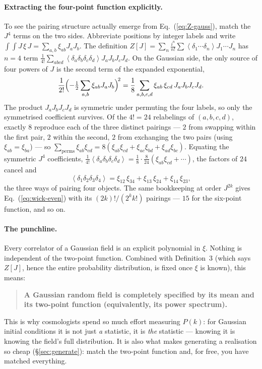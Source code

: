 \documentclass[12pt]{article}
\newcommand{\avg}[1]{\left\langle #1 \right\rangle}
\begin{document}
\paragraph{Extracting the four-point function explicitly.}  To see the
pairing structure actually emerge from Eq.~(\ref{eq:Z-gauss}), match the
$J^4$ terms on the two sides.  Abbreviate positions by integer labels and
write $\int\!\!\int J\,\xi\,J = \sum_{a,b}\xi_{ab}J_aJ_b$.  The definition
$Z[J] = \sum_n \frac{i^n}{n!}\sum \avg{\delta_1\cdots\delta_n}
J_1\cdots J_n$ has $n=4$ term
$\frac{1}{4!}\sum_{abcd}\avg{\delta_a\delta_b\delta_c\delta_d}
J_aJ_bJ_cJ_d$.  On the Gaussian side, the only source of four powers of
$J$ is the second term of the expanded exponential,
\begin{equation}
  \frac{1}{2!}\Bigl(-\tfrac12\sum_{a,b}\xi_{ab}J_aJ_b\Bigr)^{\!2}
  = \frac{1}{8}\sum_{a,b,c,d}\xi_{ab}\,\xi_{cd}\,J_aJ_bJ_cJ_d .
\end{equation}
The product $J_aJ_bJ_cJ_d$ is symmetric under permuting the four labels,
so only the symmetrised coefficient survives.  Of the $4! = 24$
relabelings of $(a,b,c,d)$, exactly $8$ reproduce each of the three
distinct pairings --- $2$ from swapping within the first pair, $2$ within
the second, $2$ from exchanging the two pairs (using
$\xi_{ab}=\xi_{ba}$) --- so
$\sum_{\text{perms}}\xi_{ab}\xi_{cd}
= 8(\xi_{ab}\xi_{cd}+\xi_{ac}\xi_{bd}+\xi_{ad}\xi_{bc})$.  Equating the
symmetric $J^4$ coefficients, $\frac{1}{4!}\avg{\delta_a\delta_b\delta_c
\delta_d} = \frac{1}{8}\cdot\frac{8}{24}
(\xi_{ab}\xi_{cd}+\cdots)$, the factors of $24$ cancel and
\begin{equation}
  \avg{\delta_1\delta_2\delta_3\delta_4}
  = \xi_{12}\,\xi_{34} + \xi_{13}\,\xi_{24} + \xi_{14}\,\xi_{23},
  \label{eq:wick4}
\end{equation}
the three ways of pairing four objects.  The same bookkeeping at order
$J^{2k}$ gives Eq.~(\ref{eq:wick-even}) with its
$(2k)!/(2^k k!)$ pairings --- $15$ for the six-point function, and so on.

\paragraph{The punchline.}  Every correlator of a Gaussian field is an
explicit polynomial in $\xi$.  Nothing is independent of the two-point
function.  Combined with Definition~3 (which says $Z[J]$, hence the
entire probability distribution, is fixed once $\xi$ is known), this
means:
\begin{quote}
\textbf{A Gaussian random field is completely specified by its mean and
its two-point function (equivalently, its power spectrum).}
\end{quote}
This is why cosmologists spend so much effort measuring $P(k)$: for
Gaussian initial conditions it is not just \emph{a} statistic, it is
\emph{the} statistic --- knowing it is knowing the field's full
distribution.  It is also what makes generating a realisation so cheap
(\S\ref{sec:generate}): match the two-point function and, for free, you
have matched everything.
\end{document}
